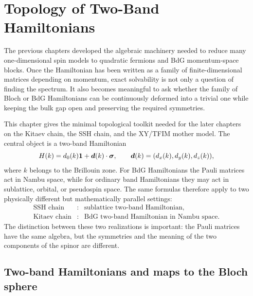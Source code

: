 \chapter{Topology of Two-Band Hamiltonians}
\label{chap:topology-two-band-hamiltonians}

The previous chapters developed the algebraic machinery needed to reduce many
one-dimensional spin models to quadratic fermions and BdG momentum-space
blocks.  Once the Hamiltonian has been written as a family of finite-dimensional
matrices depending on momentum, exact solvability is not only a question of
finding the spectrum.  It also becomes meaningful to ask whether the family of
Bloch or BdG Hamiltonians can be continuously deformed into a trivial one while
keeping the bulk gap open and preserving the required symmetries.

This chapter gives the minimal topological toolkit needed for the later chapters
on the Kitaev chain, the SSH chain, and the XY/TFIM mother model.  The central
object is a two-band Hamiltonian
\begin{equation}
\label{eq:topo-two-band-general}
    H(k)=d_0(k)\mathbf{1}+\bm d(k)\cdot\bm\sigma,
    \qquad
    \bm d(k)=(d_x(k),d_y(k),d_z(k)),
\end{equation}
where $k$ belongs to the Brillouin zone.  For BdG Hamiltonians the Pauli
matrices act in Nambu space, while for ordinary band Hamiltonians they may act
in sublattice, orbital, or pseudospin space.  The same formulas therefore apply
to two physically different but mathematically parallel settings:
\begin{equation}
\label{eq:topo-two-realizations}
\begin{array}{ccl}
\text{SSH chain} &:& \text{sublattice two-band Hamiltonian},\\[2pt]
\text{Kitaev chain} &:& \text{BdG two-band Hamiltonian in Nambu space}.
\end{array}
\end{equation}
The distinction between these two realizations is important: the Pauli matrices
have the same algebra, but the symmetries and the meaning of the two components
of the spinor are different.

\section{Two-band Hamiltonians and maps to the Bloch sphere}
\label{sec:topo-two-band-bloch-sphere}

